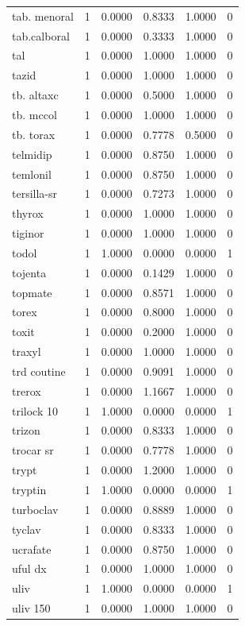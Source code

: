 \begin{longtable}{p{3.0cm}rrrrr}
tab. menoral & 1 & 0.0000 & 0.8333 & 1.0000 & 0 \\
tab.calboral & 1 & 0.0000 & 0.3333 & 1.0000 & 0 \\
tal & 1 & 0.0000 & 1.0000 & 1.0000 & 0 \\
tazid & 1 & 0.0000 & 1.0000 & 1.0000 & 0 \\
tb. altaxc & 1 & 0.0000 & 0.5000 & 1.0000 & 0 \\
tb. mccol & 1 & 0.0000 & 1.0000 & 1.0000 & 0 \\
tb. torax & 1 & 0.0000 & 0.7778 & 0.5000 & 0 \\
telmidip & 1 & 0.0000 & 0.8750 & 1.0000 & 0 \\
temlonil & 1 & 0.0000 & 0.8750 & 1.0000 & 0 \\
tersilla-sr & 1 & 0.0000 & 0.7273 & 1.0000 & 0 \\
thyrox & 1 & 0.0000 & 1.0000 & 1.0000 & 0 \\
tiginor & 1 & 0.0000 & 1.0000 & 1.0000 & 0 \\
todol & 1 & 1.0000 & 0.0000 & 0.0000 & 1 \\
tojenta & 1 & 0.0000 & 0.1429 & 1.0000 & 0 \\
topmate & 1 & 0.0000 & 0.8571 & 1.0000 & 0 \\
torex & 1 & 0.0000 & 0.8000 & 1.0000 & 0 \\
toxit & 1 & 0.0000 & 0.2000 & 1.0000 & 0 \\
traxyl & 1 & 0.0000 & 1.0000 & 1.0000 & 0 \\
trd coutine & 1 & 0.0000 & 0.9091 & 1.0000 & 0 \\
trerox & 1 & 0.0000 & 1.1667 & 1.0000 & 0 \\
trilock 10 & 1 & 1.0000 & 0.0000 & 0.0000 & 1 \\
trizon & 1 & 0.0000 & 0.8333 & 1.0000 & 0 \\
trocar sr & 1 & 0.0000 & 0.7778 & 1.0000 & 0 \\
trypt & 1 & 0.0000 & 1.2000 & 1.0000 & 0 \\
tryptin & 1 & 1.0000 & 0.0000 & 0.0000 & 1 \\
turboclav & 1 & 0.0000 & 0.8889 & 1.0000 & 0 \\
tyclav & 1 & 0.0000 & 0.8333 & 1.0000 & 0 \\
ucrafate & 1 & 0.0000 & 0.8750 & 1.0000 & 0 \\
uful dx & 1 & 0.0000 & 1.0000 & 1.0000 & 0 \\
uliv & 1 & 1.0000 & 0.0000 & 0.0000 & 1 \\
uliv 150 & 1 & 0.0000 & 1.0000 & 1.0000 & 0 \\

\end{longtable}
